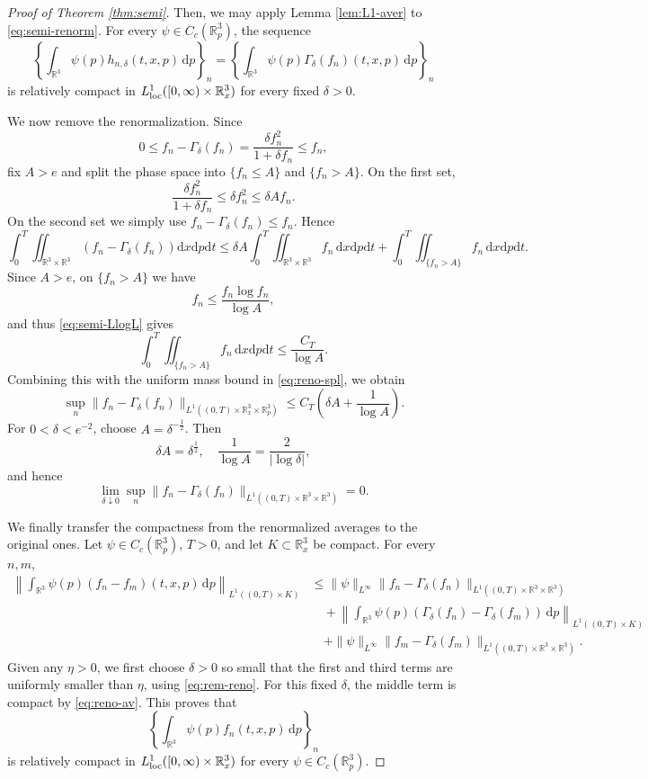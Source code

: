 \documentclass[10pt,reqno]{amsart}
\numberwithin{equation}{section}
\theoremstyle{definition}
\newcommand{\R}{\mathbb R}
\newcommand{\dx}{\mathrm{d}x}
\newcommand{\dpp}{\mathrm{d}p}
\newcommand{\dt}{\mathrm{d}t}
\newcommand{\bq}{\begin{equation}}
\newcommand{\eq}{\end{equation}}
\newcommand{\lt}{\left}
\newcommand{\rt}{\right}
\begin{document}
\begin{proof}[Proof of Theorem \ref{thm:semi}]
Then, we may apply Lemma \ref{lem:L1-aver} to \eqref{eq:semi-renorm}.  For every $\psi\in C_c(\R^3_p)$, the sequence
\bq \label{eq:reno-av}
 \lt\{  \int_{\R^3}  \psi(p)h_{n,\delta}(t,x,p)\,\dpp  \rt\}_n  =  \lt\{  \int_{\R^3}  \psi(p)\Gamma_\delta(f_n)(t,x,p)\,\dpp  \rt\}_n
\eq
is relatively compact in $ L^1_{\rm loc}([0,\infty)\times\R^3_x)$ for every fixed $\delta>0$.

We now remove the renormalization.  Since
\[
 0\leq  f_n-\Gamma_\delta(f_n)  =  \frac{\delta f_n^2}{1+\delta f_n}  \leq f_n,
\]
fix $A>e$ and split the phase space into $\{f_n\leq A\}$ and $\{f_n>A\}$.  On the first set,
\[
 \frac{\delta f_n^2}{1+\delta f_n}  \leq\delta f_n^2  \leq\delta A f_n.
\]
On the second set we simply use $f_n-\Gamma_\delta(f_n)\leq f_n$.  Hence
\bq \label{eq:reno-spl}
\int_0^T  \iint_{\R^3\times\R^3}  \lt(f_n-\Gamma_\delta(f_n)\rt) \dx\dpp\dt   \leq  \delta A  \int_0^T  \iint_{\R^3\times\R^3}  f_n\,\dx\dpp\dt  +  \int_0^T  \iint_{\{f_n>A\}}  f_n\,\dx\dpp\dt.
\eq
Since $A>e$, on $\{f_n>A\}$ we have
\[
 f_n  \leq  \frac{f_n\log f_n}{\log A},
\]
and thus \eqref{eq:semi-LlogL} gives
\[
 \int_0^T  \iint_{\{f_n>A\}}f_n\,\dx\dpp\dt  \leq  \frac{C_T}{\log A}.
\]
Combining this with the uniform mass bound in \eqref{eq:reno-spl}, we obtain
\[
 \sup_n  \|f_n-\Gamma_\delta(f_n)\|_  {L^1((0,T)\times\R^3_x\times\R^3_p)}  \leq  C_T\lt(  \delta A+\frac1{\log A}  \rt).
\]
For $0<\delta<e^{-2}$, choose $ A=\delta^{-\frac12}$. Then
\[
 \delta A=\delta^{\frac12},  \quad  \frac1{\log A}  =\frac{2}{|\log\delta|},
\]
and hence
\bq \label{eq:rem-reno}
 \lim_{\delta\downarrow0}  \sup_n  \|f_n-\Gamma_\delta(f_n)\|_  {L^1((0,T)\times\R^3\times\R^3)}  =0.
\eq

We finally transfer the compactness from the renormalized averages to the original ones.  Let $\psi\in C_c(\R^3_p)$, $T>0$, and let $K\subset\R^3_x$ be compact.  For every $n,m$,
\begin{align*}
 \lt\|  \int_{\R^3}\psi(p)  \lt(f_n-f_m\rt)(t,x,p)\,\dpp  \rt\|_{L^1((0,T)\times K)}
 & \leq  \|\psi\|_{L^\infty}  \|f_n-\Gamma_\delta(f_n)\|_  {L^1((0,T)\times\R^3\times\R^3)}  \\
 &\quad+  \lt\|  \int_{\R^3}\psi(p)  \lt(  \Gamma_\delta(f_n)-\Gamma_\delta(f_m)  \rt)\,\dpp  \rt\|_{L^1((0,T)\times K)}  \\
 &\quad+ \|\psi\|_{L^\infty} \|f_m-\Gamma_\delta(f_m)\|_{L^1((0,T)\times\R^3\times\R^3)}.
\end{align*}
Given any $\eta>0$, we first choose $\delta>0$ so small that the first and third terms are uniformly smaller than $\eta$, using \eqref{eq:rem-reno}.  For this fixed $\delta$, the middle term is compact by \eqref{eq:reno-av}.  This proves that
\[
 \lt\{  \int_{\R^3}  \psi(p)f_n(t,x,p)\,\dpp  \rt\}_n
\]
is relatively compact in $ L^1_{\rm loc}([0,\infty)\times\R^3_x)$ for every $\psi\in C_c(\R^3_p)$.



\end{proof}
\end{document}
